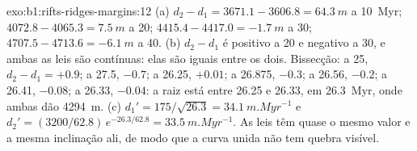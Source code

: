 \begin{solution}{exo:b1:rifts-ridges-margins:12}
(a) $d_2 - d_1 = 3671.1 - 3606.8 = \qty{64.3}{m}$ a \qty{10}{Myr};
$4072.8 - 4065.3 = \qty{7.5}{m}$ a 20; $4415.4 - 4417.0 = \qty{-1.7}{m}$ a
30; $4707.5 - 4713.6 = \qty{-6.1}{m}$ a 40. (b) $d_2 - d_1$ é positivo a 20
e negativo a 30, e ambas as leis são contínuas: elas são iguais entre os dois.
Bissecção: a 25, $d_2 - d_1 = +0.9$; a 27.5, $-0.7$; a 26.25, $+0.01$; a
26.875, $-0.3$; a 26.56, $-0.2$; a 26.41, $-0.08$; a 26.33, $-0.04$: a raiz
está entre 26.25 e 26.33, em \qty{26.3}{Myr}, onde ambas dão
\qty{4294}{m}. (c) $d_1' = 175/\sqrt{26.3} = \qty{34.1}{m.Myr^{-1}}$ e
$d_2' = (3200/62.8)\,e^{-26.3/62.8} = \qty{33.5}{m.Myr^{-1}}$. As leis têm
quase o mesmo valor e a mesma inclinação ali, de modo que a curva unida não tem
quebra visível.
\end{solution}

